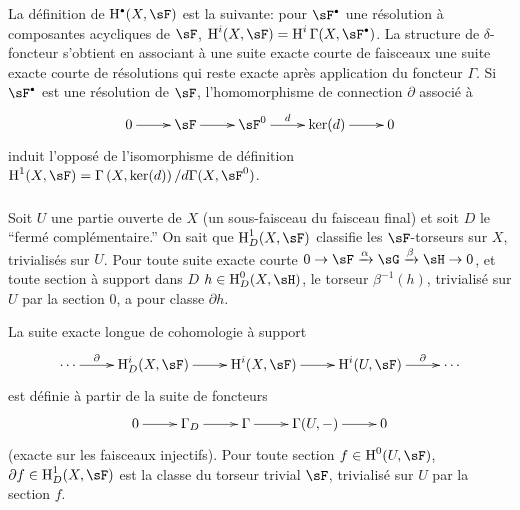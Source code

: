 \subsubsection{}\label{IV:1-1-3}

La définition de $\h^\bullet(X,\sF)$ est la suivante: pour $\sF^\bullet$ une 
résolution à composantes acycliques de $\sF$, 
$\h^i(X,\sF) = \h^i\Gamma(X,\sF^\bullet)$. La structure de $\delta$-foncteur 
s'obtient en associant à une suite exacte courte de faisceaux une suite 
exacte courte de résolutions qui reste exacte après application du 
foncteur $\Gamma$. Si $\sF^\bullet$ est une résolution de $\sF$, 
l'homomorphisme de connection $\partial$ associé à 
\[\xymatrix{
  0 \ar[r]
    & \sF \ar[r]
    & \sF^0 \ar[r]^-d 
    & \ker(d) \ar[r] 
    & 0
}\]
induit l'opposé de l'isomorphisme de définition 
$\h^1(X,\sF) = \Gamma\left(X,\ker(d)\right)/d \Gamma(X,\sF^0)$. 





\subsubsection{}\label{IV:1-1-4}

Soit $U$ une partie ouverte de $X$ (un sous-faisceau du faisceau final) et 
soit $D$ le ``fermé complémentaire.'' On sait que $\h_D^1(X,\sF)$ 
classifie les $\sF$-torseurs sur $X$, trivialisés sur $U$. Pour toute suite 
exacte courte $0\to \sF\xrightarrow\alpha \sG\xrightarrow\beta\sH\to 0$, et 
toute section à support dans $D$ $h\in\h_D^0(X,\sH)$, le torseur 
$\beta^{-1}(h)$, trivialisé sur $U$ par la section $0$, a pour classe 
$\partial h$.

La suite exacte longue de cohomologie à support
\[\xymatrix{
  \cdots \ar[r]^-\partial 
    & \h_D^i(X,\sF) \ar[r] 
    & \h^i(X,\sF) \ar[r]
    & \h^i(U,\sF) \ar[r]^-\partial 
    & \cdots
}\]
est définie à partir de la suite de foncteurs 
\[\xymatrix{
  0 \ar[r] 
    & \Gamma_D \ar[r] 
    & \Gamma \ar[r] 
    & \Gamma(U,-) \ar[r] 
    & 0
}\]
(exacte sur les faisceaux injectifs). Pour toute section $f\in \h^0(U,\sF)$, 
$\partial f\in \h_D^1(X,\sF)$ est la classe du torseur trivial $\sF$, 
trivialisé sur $U$ par la section $f$. 





\subsubsection{}\label{IV:1-1-5}

